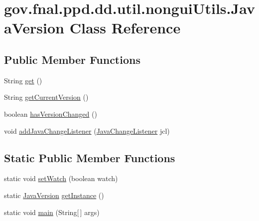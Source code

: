 \hypertarget{classgov_1_1fnal_1_1ppd_1_1dd_1_1util_1_1nonguiUtils_1_1JavaVersion}{\section{gov.\-fnal.\-ppd.\-dd.\-util.\-nongui\-Utils.\-Java\-Version Class Reference}
\label{classgov_1_1fnal_1_1ppd_1_1dd_1_1util_1_1nonguiUtils_1_1JavaVersion}
}
\subsection*{Public Member Functions}
\begin{DoxyCompactItemize}
\item 
String \hyperlink{classgov_1_1fnal_1_1ppd_1_1dd_1_1util_1_1nonguiUtils_1_1JavaVersion_a4cf56269f3f9b24efd54f9dd9fb582d5}{get} ()
\item 
String \hyperlink{classgov_1_1fnal_1_1ppd_1_1dd_1_1util_1_1nonguiUtils_1_1JavaVersion_a62a8c1919158951af98647fedf0dec57}{get\-Current\-Version} ()
\item 
boolean \hyperlink{classgov_1_1fnal_1_1ppd_1_1dd_1_1util_1_1nonguiUtils_1_1JavaVersion_aa2e6bfccd08763f02d852f94d92756b3}{has\-Version\-Changed} ()
\item 
void \hyperlink{classgov_1_1fnal_1_1ppd_1_1dd_1_1util_1_1nonguiUtils_1_1JavaVersion_a287cd5bd534c301887af7af810ffd166}{add\-Java\-Change\-Listener} (\hyperlink{interfacegov_1_1fnal_1_1ppd_1_1dd_1_1util_1_1nonguiUtils_1_1JavaChangeListener}{Java\-Change\-Listener} jcl)
\end{DoxyCompactItemize}
\subsection*{Static Public Member Functions}
\begin{DoxyCompactItemize}
\item 
static void \hyperlink{classgov_1_1fnal_1_1ppd_1_1dd_1_1util_1_1nonguiUtils_1_1JavaVersion_a1feaadadf0d1163f6df8ef6b4d783f3b}{set\-Watch} (boolean watch)
\item 
static \hyperlink{classgov_1_1fnal_1_1ppd_1_1dd_1_1util_1_1nonguiUtils_1_1JavaVersion}{Java\-Version} \hyperlink{classgov_1_1fnal_1_1ppd_1_1dd_1_1util_1_1nonguiUtils_1_1JavaVersion_af95cfca80d031461d235ea2a10a7d3d3}{get\-Instance} ()
\item 
static void \hyperlink{classgov_1_1fnal_1_1ppd_1_1dd_1_1util_1_1nonguiUtils_1_1JavaVersion_ab3e14c1ea46c3dae60f9d35a07f9c549}{main} (String\mbox{[}$\,$\mbox{]} args)
\end{DoxyCompactItemize}


